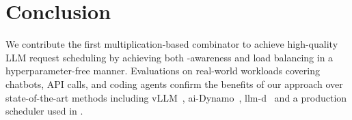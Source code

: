 \section{Conclusion}
\label{sec:concl}

\noindent
We contribute the first multiplication-based combinator to achieve high-quality LLM request scheduling
by achieving both {\kvcache}-awareness and load balancing in a hyperparameter-free manner.
Evaluations on real-world workloads covering chatbots, API calls, and coding agents
confirm the benefits of our approach over state-of-the-art methods including vLLM~\cite{vllm-code}, ai-Dynamo~\cite{ai-Dynamo}, llm-d~\cite{llm-d} 
and a production scheduler used in {\company}.